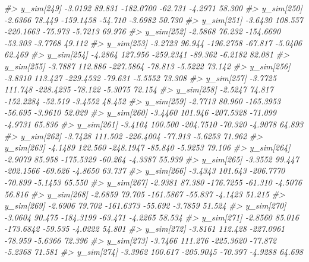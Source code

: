 \documentclass[
  10pt,
  italian,
  a4paper,
  extrafontsizes,onecolumn,openright
  ]{memoir}
\newenvironment{Shaded}{\begin{snugshade}}{\end{snugshade}}
\newcommand{\CommentTok}[1]{\textcolor[rgb]{0.56,0.35,0.01}{\textit{#1}}}
\begin{document}
\begin{Shaded}
\begin{Highlighting}[]
\CommentTok{\#\textgreater{}   y\_sim[249] {-}3.0192  89.831 {-}182.0700 {-}62.731 {-}4.2971 58.300}
\CommentTok{\#\textgreater{}   y\_sim[250] {-}2.6366  78.449 {-}159.1458 {-}54.710 {-}3.6982 50.730}
\CommentTok{\#\textgreater{}   y\_sim[251] {-}3.6430 108.557 {-}220.1663 {-}75.973 {-}5.7213 69.976}
\CommentTok{\#\textgreater{}   y\_sim[252] {-}2.5868  76.232 {-}154.6690 {-}53.303 {-}3.7768 49.112}
\CommentTok{\#\textgreater{}   y\_sim[253] {-}3.2723  96.944 {-}196.2758 {-}67.817 {-}5.0406 62.469}
\CommentTok{\#\textgreater{}   y\_sim[254] {-}4.2864 127.956 {-}259.2341 {-}89.362 {-}6.2182 82.081}
\CommentTok{\#\textgreater{}   y\_sim[255] {-}3.7887 112.886 {-}227.5864 {-}78.813 {-}5.5222 73.142}
\CommentTok{\#\textgreater{}   y\_sim[256] {-}3.8310 113.427 {-}229.4532 {-}79.631 {-}5.5552 73.308}
\CommentTok{\#\textgreater{}   y\_sim[257] {-}3.7725 111.748 {-}228.4235 {-}78.122 {-}5.3075 72.154}
\CommentTok{\#\textgreater{}   y\_sim[258] {-}2.5247  74.817 {-}152.2284 {-}52.519 {-}3.4552 48.452}
\CommentTok{\#\textgreater{}   y\_sim[259] {-}2.7713  80.960 {-}165.3953 {-}56.695 {-}3.9610 52.029}
\CommentTok{\#\textgreater{}   y\_sim[260] {-}3.4460 101.946 {-}207.5328 {-}71.099 {-}4.9731 65.836}
\CommentTok{\#\textgreater{}   y\_sim[261] {-}3.4104 100.500 {-}204.7510 {-}70.320 {-}4.9078 64.893}
\CommentTok{\#\textgreater{}   y\_sim[262] {-}3.7428 111.502 {-}226.4004 {-}77.913 {-}5.6253 71.962}
\CommentTok{\#\textgreater{}   y\_sim[263] {-}4.1489 122.560 {-}248.1947 {-}85.840 {-}5.9253 79.106}
\CommentTok{\#\textgreater{}   y\_sim[264] {-}2.9079  85.958 {-}175.5329 {-}60.264 {-}4.3387 55.939}
\CommentTok{\#\textgreater{}   y\_sim[265] {-}3.3552  99.447 {-}202.1566 {-}69.626 {-}4.8650 63.737}
\CommentTok{\#\textgreater{}   y\_sim[266] {-}3.4343 101.643 {-}206.7770 {-}70.899 {-}5.1453 65.550}
\CommentTok{\#\textgreater{}   y\_sim[267] {-}2.9381  87.380 {-}176.7255 {-}61.310 {-}4.5076 56.816}
\CommentTok{\#\textgreater{}   y\_sim[268] {-}2.6859  79.705 {-}161.5867 {-}55.837 {-}4.1423 51.215}
\CommentTok{\#\textgreater{}   y\_sim[269] {-}2.6906  79.702 {-}161.6373 {-}55.692 {-}3.7859 51.524}
\CommentTok{\#\textgreater{}   y\_sim[270] {-}3.0604  90.475 {-}184.3199 {-}63.471 {-}4.2265 58.534}
\CommentTok{\#\textgreater{}   y\_sim[271] {-}2.8560  85.016 {-}173.6842 {-}59.535 {-}4.0222 54.801}
\CommentTok{\#\textgreater{}   y\_sim[272] {-}3.8161 112.428 {-}227.0961 {-}78.959 {-}5.6366 72.396}
\CommentTok{\#\textgreater{}   y\_sim[273] {-}3.7466 111.276 {-}225.3620 {-}77.872 {-}5.2368 71.581}
\CommentTok{\#\textgreater{}   y\_sim[274] {-}3.3962 100.617 {-}205.9045 {-}70.397 {-}4.9288 64.698}

\end{Highlighting}
\end{Shaded}
\end{document}
